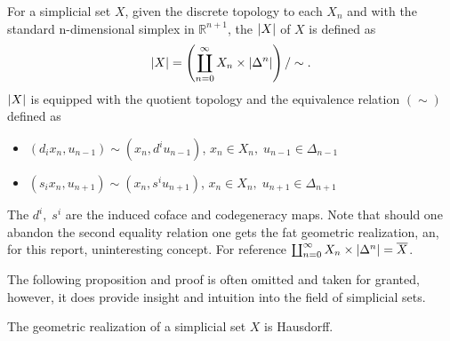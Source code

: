 \documentclass[../../main.tex]{subfiles}
\begin{document}
    \begin{definition}
        For a simplicial set $X$, given the discrete topology to each $X_n$ and with the standard n-dimensional simplex in $\mathbb{R}^{n+1}$, the  $\geom[X]$ of $X$ is defined as
        \[\geom[X]=\left(\coprod_{n=0}^{\infty} X_n \times \geom[\Delta^n]\right)/\sim.\]
        $\geom[X]$ is equipped with the quotient topology and the equivalence relation $(\sim)$ defined as 
        \begin{itemize}
            \item $(d_ix_{n},u_{n-1})\sim(x_{n}, d^iu_{n-1})$, $x_n\in X_n,\; u_{n-1} \in \Delta _{n-1}$
            \item $(s_ix_n, u_{n+1})\sim(x_n, s^iu_{n+1})$, $x_n \in X_n,\; u_{n+1}\in \Delta_{n+1}$
        \end{itemize}
    \end{definition}
    
    The $d^i,\; s^i$ are the induced coface and codegeneracy maps. Note that should one abandon the second equality relation one gets the fat geometric realization, an, for this report, uninteresting concept. For reference $\coprod_{n=0}^{\infty} X_n \times \geom[\Delta^n]= \bigGeom X$.

    The following proposition and proof is often omitted and taken for granted, however, it does provide insight and intuition into the field of simplicial sets. 

    \begin{proposition}
        The geometric realization of a simplicial set $X$ is Hausdorff.
    \end{proposition}
\end{document}
